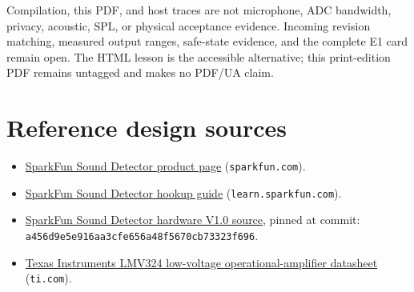 \documentclass[11pt]{article}
\begin{document}
Compilation, this PDF, and host traces are not microphone, ADC bandwidth,
privacy, acoustic, SPL, or physical acceptance evidence. Incoming revision
matching, measured output ranges, safe-state evidence, and the complete E1
card remain open. The HTML lesson is the accessible alternative; this
print-edition PDF remains untagged and makes no PDF/UA claim.

\enlargethispage{2\baselineskip}
\section{Reference design sources}
\begin{itemize}
 \item \href{https://www.sparkfun.com/sparkfun-sound-detector.html}
       {SparkFun Sound Detector product page} (\texttt{sparkfun.com}).
 \item \href{https://learn.sparkfun.com/tutorials/sound-detector-hookup-guide}
       {SparkFun Sound Detector hookup guide}
       (\texttt{learn.sparkfun.com}).
 \item \href{https://github.com/sparkfun/Sound_Detector/tree/a456d9e5e916aa3cfe656a48f5670cb73323f696}
       {SparkFun Sound Detector hardware V1.0 source}, pinned at commit:
       \newline\texttt{a456d9e5e916aa3cfe656a48f5670cb73323f696}.
 \item \href{https://www.ti.com/lit/ds/symlink/lmv324.pdf}
       {Texas Instruments LMV324 low-voltage operational-amplifier datasheet}
       (\texttt{ti.com}).
\end{itemize}
\end{document}
